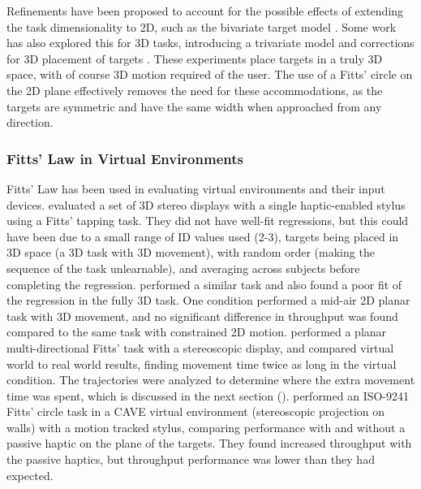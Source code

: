 Refinements have been proposed to account for the possible effects of extending the task dimensionality to 2D, such as the bivariate target model \citep{accot_refining_2003, mackenzie_extending_1992, wobbrock_error_2008}.
Some work has also explored this for 3D tasks, introducing a trivariate model \citep{grossman_pointing_2004} and corrections for 3D placement of targets \citep{cha_extended_2013, murata_extending_2001}.
These experiments place targets in a truly 3D space, with of course 3D motion required of the user.
The use of a Fitts' circle on the 2D plane effectively removes the need for these accommodations, as the targets are symmetric and have the same width when approached from any direction.

\subsubsection{Fitts' Law in Virtual Environments}\label{applying-fitts-to-virtual-environment}

Fitts' Law has been used in evaluating virtual environments and their input devices.
\citet{chun_evaluating_2004} evaluated a set of 3D stereo displays with a single haptic-enabled stylus using a Fitts' tapping task.
They did not have well-fit regressions, but this could have been due to a small range of ID values used (2-3), targets being placed in 3D space (a 3D task with 3D movement), with random order (making the sequence of the task un\-learn\-able), and averaging across subjects before completing the regression.
\citet{teather_evaluating_2010} performed a similar task and also found a poor fit of the regression in the fully 3D task.
One condition performed a mid-air 2D planar task with 3D movement, and no significant difference in throughput was found compared to the same task with constrained 2D motion.
\citet{liu_comparing_2009} performed a planar multi-directional Fitts' task with a stereoscopic display, and compared virtual world to real world results, finding movement time twice as long in the virtual condition.
The trajectories were analyzed to determine where the extra movement time was spent, which is discussed in the next section ().
\citet{teather_pointing_2011} performed an ISO-9241 Fitts' circle task in a CAVE virtual environment (stereoscopic projection on walls) with a motion tracked stylus, comparing performance with and without a passive haptic on the plane of the targets.
They found increased throughput with the passive haptics, but throughput performance was lower than they had expected.

